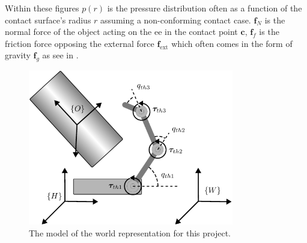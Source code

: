 \begin{center}
\begin{minipage}{.48\linewidth}
    \end{minipage}%
    \vspace{15pt}
    \begin{minipage}[t]{.48\linewidth}
        \vspace{0pt}
        \captionsetup{type=figure}
        \label{fig:friction-contact-distribution}
    \end{minipage}%
    \hfill%
    \begin{minipage}[t]{.48\linewidth}
        \vspace{0pt}
        \captionsetup{type=figure}
        \label{fig:force-closure-model}
    \end{minipage}%
\end{center}

Within these figures $p(r)$ is the pressure distribution often as a function of the contact surface's radius $r$ assuming a non-conforming contact case. $\bm{f}_N$ is the normal force of the object acting on the \gls{ee} in the contact point $\bm{c}$, $\bm{f}_f$ is the friction force opposing the external force $\bm{f}_{\text{ext}}$ which often comes in the form of gravity $\bm{f}_g$ as see in .


\begin{figure}[h]
	\begin{small}
		\begin{center}
			\includegraphics[width=0.8\textwidth]{chapters/modeling/fig/kinematic-tree-manipulator.pdf}
		\end{center}
		\caption{The model of the world representation for this project.}
		\label{fig:full-system-model}
	\end{small}
\end{figure}

